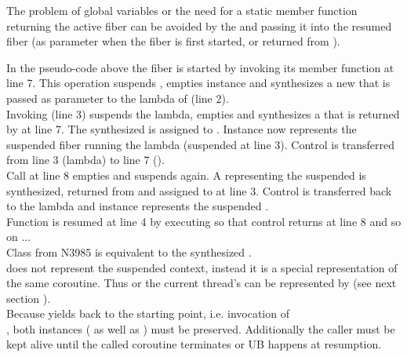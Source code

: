 \label{solution_gpub}


\label{synthesizing}
The problem of global variables or the need for a static member function
returning the active fiber can be avoided by  the
 and passing it into the resumed fiber (as parameter when the
fiber is first started, or returned from \resume).

In the pseudo-code above the fiber  is started by invoking its member
function \resume at line 7. This operation suspends , empties
instance  and synthesizes a new \fiber\xspace {} that is passed as parameter
to the lambda of  (line 2).\\
Invoking  (line 3) suspends the lambda, empties  and
synthesizes a \fiber that is returned by  at line 7. The
synthesized \fiber is assigned to . Instance  now represents the
suspended fiber running the lambda (suspended at line 3). Control is
transferred from line 3 (lambda) to line 7 ().\\
Call  at line 8 empties  and suspends 
again. A \fiber representing the suspended  is synthesized, returned
from  and assigned to  at line 3. Control
is transferred back to the lambda and instance  represents the suspended
.\\
Function  is resumed at line 4 by executing  so that
control returns at line 8 and so on ...\\

Class  from N3985\cite{N3985} is
 equivalent to the synthesized \fiber.\\
 does not represent the suspended context,
instead it is a special representation of the same coroutine. Thus \main or
the current thread's \entryfn can  be represented by 
(see next section ).\\
Because  yields back to the starting
point, i.e. invocation of\\
,
both instances ( as well as ) must be preserved.
Additionally the caller must be kept alive until the called coroutine terminates
or UB happens at resumption.\\

